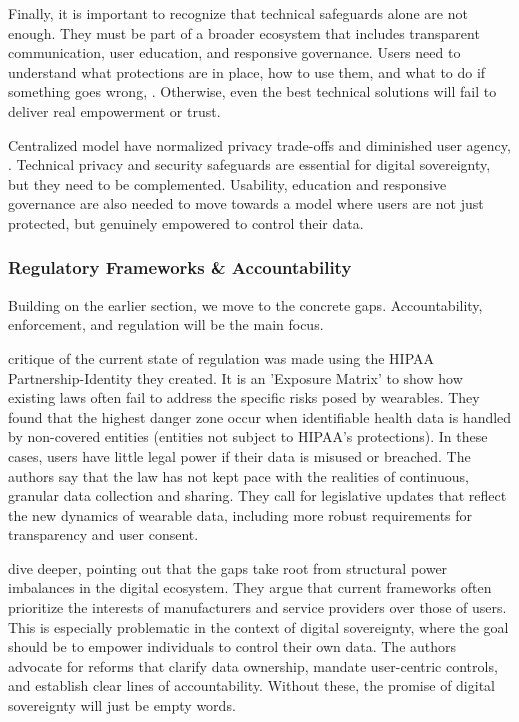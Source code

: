 	Finally, it is important to recognize that technical safeguards alone are not enough. They must be part of a broader ecosystem that includes transparent communication, user education, and responsive governance. Users need to understand what protections are in place, how to use them, and what to do if something goes wrong, \cite{Cilliers2019}. Otherwise, even the best technical solutions will fail to deliver real empowerment or trust.

	Centralized model have normalized privacy trade-offs and diminished user agency, \cite{Cilliers2019}. Technical privacy and security safeguards are essential for digital sovereignty, but they need to be complemented. Usability, education and responsive governance are also needed to move towards a model where users are not just protected, but genuinely empowered to control their data.
	\subsubsection{Regulatory Frameworks \& Accountability}

	Building on the earlier section, we move to the concrete gaps. Accountability, enforcement, and regulation will be the main focus.

	\cite{Banerjee2018} critique of the current state of regulation was made using the HIPAA Partnership-Identity they created. It is an 'Exposure Matrix' to show how existing laws often fail to address the specific risks posed by wearables. They found that the highest danger zone occur when identifiable health data is handled by non-covered entities (entities not subject to HIPAA’s protections). In these cases, users have little legal power if their data is misused or breached. The authors say that the law has not kept pace with the realities of continuous, granular data collection and sharing. They call for legislative updates that reflect the new dynamics of wearable data, including more robust requirements for transparency and user consent.

	\cite{Conradie2022} dive deeper, pointing out that the gaps take root from structural power imbalances in the digital ecosystem. They argue that current frameworks often prioritize the interests of manufacturers and service providers over those of users. This is especially problematic in the context of digital sovereignty, where the goal should be to empower individuals to control their own data. The authors advocate for reforms that clarify data ownership, mandate user-centric controls, and establish clear lines of accountability. Without these, the promise of digital sovereignty will just be empty words.

